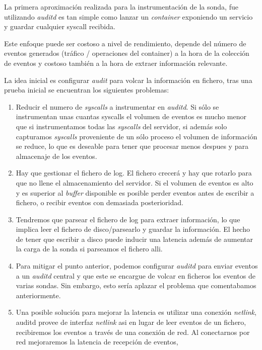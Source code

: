 La primera aproximación realizada para la instrumentación de la sonda, fue utilizando \emph{auditd} es tan simple como lanzar un \emph{container} exponiendo un servicio
y guardar cualquier syscall recibida. 

Este enfoque puede ser costoso a nivel de rendimiento, depende del número de eventos generados (tráfico / operaciones del container) a la hora de la colección de eventos
y costoso también a la hora de extraer información relevante.

La idea inicial es configurar \emph{audit} para volcar la información en fichero, tras una prueba inicial se encuentran los siguientes problemas:

\begin{enumerate}
    \item Reducir el numero de \emph{syscalls} a instrumentar en \emph{auditd}. Si sólo se instrumentan unas cuantas syscalls el volumen de eventos es mucho menor que si
    instrumentamos todas las \emph{syscalls} del servidor, si además solo capturamos \emph{syscalls} proveniente de un sólo proceso el volumen de información se reduce, lo que es 
    deseable para tener que procesar menos despues y para almacenaje de los eventos.
    \item Hay que gestionar el fichero de log. El fichero crecerá y hay que rotarlo para que no llene el almacenamiento del servidor. Si el volumen de eventos es alto y es superior 
    al \emph{buffer} disponible es posible perder eventos antes de escribir a fichero, o recibir eventos con demasiada posterioridad.
    \item Tendremos que parsear el fichero de log para extraer información, lo que implica leer el fichero de disco/parsearlo y guardar la información. El hecho de tener que escribir a disco puede inducir una latencia además de aumentar la carga de la sonda si parseamos el fichero alli.
    \item Para mitigar el punto anterior, podemos configurar \emph{auditd} para enviar eventos a un \emph{auditd} central y que este se encargue de volcar en ficheros los eventos de varias sondas. Sin embargo, esto sería aplazar el problema
    que comentabamos anteriormente.
    \item Una posible solución para mejorar la latencia es utilizar una conexión \emph{netlink},
    auditd provee de interfaz \emph{netlink} asi en lugar de leer eventos de un fichero, 
    recibiremos los eventos a través de una conexión de red. 
    Al conectarnos por red mejoraremos la latencia de recepción de eventos, 

\end{enumerate}
